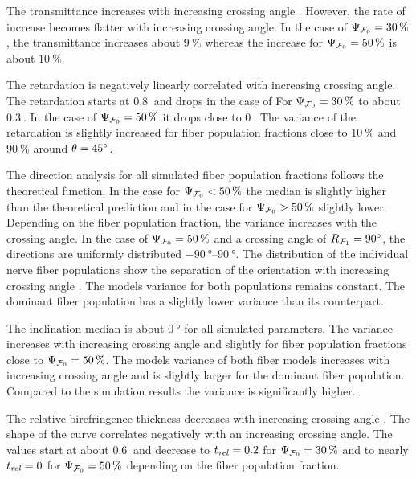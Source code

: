 %
The transmittance increases with increasing crossing angle \modelOmega{}.
However, the rate of increase becomes flatter with increasing crossing angle.
In the case of $\textnormal{$\Psi_{\textnormal{$\mathcal{F}_0$}}$} = \SI{30}{\percent}$, the transmittance increases about $\SI{9}{\percent}$ whereas the increase for $\textnormal{$\Psi_{\textnormal{$\mathcal{F}_0$}}$} = \SI{50}{\percent}$ is about $\SI{10}{\percent}$.
\par
The retardation is negatively linearly correlated with increasing crossing angle.
The retardation starts at $\SI{0.8}{}$ and drops in the case of For $\textnormal{$\Psi_{\textnormal{$\mathcal{F}_0$}}$}=\SI{30}{\percent}$ to about $\SI{0.3}{}$.
In the case of $\textnormal{$\Psi_{\textnormal{$\mathcal{F}_0$}}$}=\SI{50}{\percent}$ it drops close to $\SI{0}{}$.
The variance of the retardation is slightly increased for fiber population fractions close to $\SI{10}{\percent}$ and $\SI{90}{\percent}$ around $\textnormal{$\theta$}=\SI{45}{\degree}$.
\par
The direction analysis for all simulated fiber population fractions \modelPsi{} follows the theoretical  function.
In the case for $\textnormal{$\Psi_{\textnormal{$\mathcal{F}_0$}}$}<\SI{50}{\percent}$ the median is slightly higher than the theoretical prediction and in the case for $\textnormal{$\Psi_{\textnormal{$\mathcal{F}_0$}}$}>\SI{50}{\percent}$ slightly lower.
Depending on the fiber population fraction, the variance increases with the crossing angle.
In the case of $\textnormal{$\Psi_{\textnormal{$\mathcal{F}_0$}}$}=\SI{50}{\percent}$ and a crossing angle of $\textnormal{$R_{\textnormal{$\mathcal{F}_1$}}$} = \SI{90}{\degree}$, the directions are uniformly distributed $\SIrange{-90}{90}{\degree}$.
The distribution of the individual nerve fiber populations show the separation of the orientation with increasing crossing angle \modelOmega{}.
The models \bvariance{} variance for both populations remains constant.
The dominant fiber population has a slightly lower variance than its counterpart.
\par
The inclination median is about $\SI{0}{\degree}$ for all simulated parameters.
The variance increases with increasing crossing angle \modelOmega{} and slightly for fiber population fractions close to $\textnormal{$\Psi_{\textnormal{$\mathcal{F}_0$}}$}=\SI{50}{\percent}$.
The models \bvariance{} variance of both fiber models increases with increasing crossing angle and is slightly larger for the dominant fiber population.
Compared to the simulation results the \bvariance{} variance is significantly higher.
\par
The relative birefringence thickness \trel{} decreases with increasing crossing angle \modelOmega{}.
The shape of the curve correlates negatively with an increasing crossing angle.
The \trel{} values start at about $\SI{0.6}{}$ and decrease to $\textnormal{$t_\mathit{rel}$}=\SI{0.2}{}$ for $\textnormal{$\Psi_{\textnormal{$\mathcal{F}_0$}}$} = \SI{30}{\percent}$ and to nearly $\textnormal{$t_\mathit{rel}$}=\SI{0}{}$ for $\textnormal{$\Psi_{\textnormal{$\mathcal{F}_0$}}$} = \SI{50}{\percent}$ depending on the fiber population fraction.
